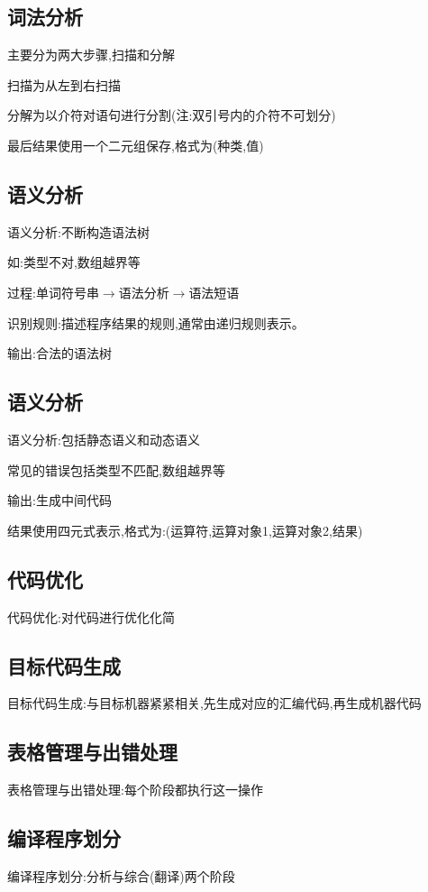 \documentclass[UTF8,a4paper]{ctexart}
\begin{document}
    \subsection{词法分析}
    主要分为两大步骤,扫描和分解

    扫描为从左到右扫描

    分解为以介符对语句进行分割(注:双引号内的介符不可划分)

    最后结果使用一个二元组保存,格式为(种类,值)

    \subsection{语义分析}
    语义分析:不断构造语法树

    如:类型不对,数组越界等

    过程:单词符号串$\to$语法分析$\to$语法短语

    识别规则:描述程序结果的规则,通常由递归规则表示。

    输出:合法的语法树

    \subsection{语义分析}
    语义分析:包括静态语义和动态语义

    常见的错误包括类型不匹配,数组越界等

    输出:生成中间代码

    结果使用四元式表示,格式为:(运算符,运算对象1,运算对象2,结果)

    \subsection{代码优化}
    代码优化:对代码进行优化化简

    \subsection{目标代码生成}
    目标代码生成:与目标机器紧紧相关,先生成对应的汇编代码,再生成机器代码

    \subsection{表格管理与出错处理}
    表格管理与出错处理:每个阶段都执行这一操作

    \subsection{编译程序划分}
    编译程序划分:分析与综合(翻译)两个阶段
\end{document}
